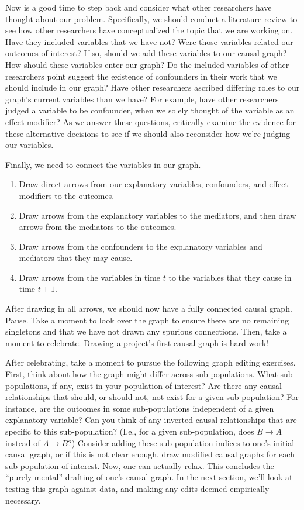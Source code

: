Now is a good time to step back and consider what other researchers have thought about our problem.
Specifically, we should conduct a literature review to see how other researchers have conceptualized the topic that we are working on.
Have they included variables that we have not?
Were those variables related our outcomes of interest?
If so, should we add these variables to our causal graph? How should these variables enter our graph?
Do the included variables of other researchers point suggest the existence of confounders in their work that we should include in our graph?
Have other researchers ascribed differing roles to our graph's current variables than we have?
For example, have other researchers judged a variable to be confounder, when we solely thought of the variable as an effect modifier?
As we answer these questions, critically examine the evidence for these alternative decisions to see if we should also reconsider how we're judging our variables.

Finally, we need to connect the variables in our graph.
\begin{enumerate}
   \item Draw direct arrows from our explanatory variables, confounders, and effect modifiers to the outcomes.
   \item Draw arrows from the explanatory variables to the mediators, and then draw arrows from the mediators to the outcomes.
   \item Draw arrows from the confounders to the explanatory variables and mediators that they may cause.
   \item Draw arrows from the variables in time $t$ to the variables that they cause in time $t+1$.
\end{enumerate}
After drawing in all arrows, we should now have a fully connected causal graph.
Pause.
Take a moment to look over the graph to ensure there are no remaining singletons and that we have not drawn any spurious connections.
Then, take a moment to celebrate.
Drawing a project's first causal graph is hard work!

After celebrating, take a moment to pursue the following graph editing exercises.
First, think about how the graph might differ across sub-populations.
What sub-populations, if any, exist in your population of interest?
Are there any causal relationships that should, or should not, not exist for a given sub-population?
For instance, are the outcomes in some sub-populations independent of a given explanatory variable?
Can you think of any inverted causal relationships that are specific to this sub-population?
(I.e., for a given sub-population, does $B \rightarrow A$ instead of $A \rightarrow B$?)
Consider adding these sub-population indices to one's initial causal graph, or if this is not clear enough, draw modified causal graphs for each sub-population of interest.
Now, one can actually relax.
This concludes the ``purely mental'' drafting of one's causal graph.
In the next section, we'll look at testing this graph against data, and making any edits deemed empirically necessary.
